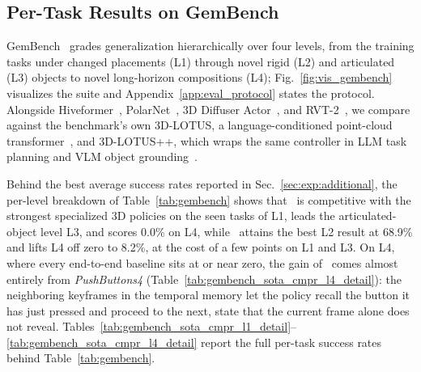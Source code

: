 



\subsection{Per-Task Results on GemBench}
\label{app:gembench_results}




GemBench~\cite{garcia2024towards} grades generalization hierarchically
over four levels, from the training tasks under changed placements
(L1) through novel rigid (L2) and articulated (L3) objects to novel
long-horizon compositions (L4); Fig.~\ref{fig:vis_gembench} visualizes
the suite and Appendix~\ref{app:eval_protocol} states the protocol.
Alongside Hiveformer~\cite{guhur2023instruction},
PolarNet~\cite{chen2023polarnet}, 3D Diffuser Actor~\cite{3d-da}, and
RVT-2~\cite{goyal2024rvt}, we compare against the benchmark's own
3D-LOTUS, a language-conditioned point-cloud
transformer~\cite{garcia2024towards,wu2024point}, and 3D-LOTUS++, which
wraps the same controller in LLM task planning and VLM object
grounding~\cite{garcia2024towards}.

Behind the best average success rates reported in
Sec.~\ref{sec:exp:additional}, the per-level breakdown of
Table~\ref{tab:gembench} shows that \method\ is competitive with the
strongest specialized 3D policies on the seen tasks of L1, leads the
articulated-object level L3, and scores 0.0\% on L4, while \memmethod\
attains the best L2 result at 68.9\% and lifts L4 off zero to 8.2\%,
at the cost of a few points on L1 and L3.
On L4, where every end-to-end baseline sits at or near zero, the gain
of \memmethod\ comes almost entirely from \emph{PushButtons4}
(Table~\ref{tab:gembench_sota_cmpr_l4_detail}): the neighboring
keyframes in the temporal memory let the policy recall the button it
has just pressed and proceed to the next, state that the current frame
alone does not reveal.
Tables~\ref{tab:gembench_sota_cmpr_l1_detail}--\ref{tab:gembench_sota_cmpr_l4_detail}
report the full per-task success rates behind
Table~\ref{tab:gembench}.







